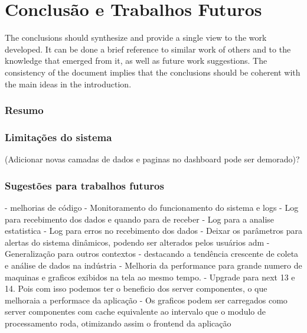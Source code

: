 \chapter{Conclusão e Trabalhos Futuros}\label{cap:conclusions}

The conclusions should synthesize and provide a single view to the work developed. It can be done a brief reference to similar work of others and to the knowledge that emerged from it, as well as future work suggestions. The consistency of the document implies that the conclusions should be coherent with the main ideas in the introduction.

\subsection[Resumo]{Resumo}

\subsection[Limitações do sistema]{Limitações do sistema}
(Adicionar novas camadas de dados e paginas no dashboard pode ser demorado)?

\subsection[Sugestões para trabalhos futuros]{Sugestões para trabalhos futuros}

- melhorias de código
- Monitoramento do funcionamento do sistema e logs
    - Log para recebimento dos dados e quando para de receber
    - Log para a analise estatistica
    - Log para erros no recebimento dos dados
- Deixar os parâmetros para alertas do sistema dinâmicos, podendo ser alterados pelos usuários adm
- Generalização para outros contextos - destacando a tendência crescente de coleta e análise de dados na indústria
- Melhoria da performance para grande numero de maquinas e graficos exibidos na tela ao mesmo tempo.
- Upgrade para next 13 e 14. Pois com isso podemos ter o beneficio dos server componentes, o que melhoraia a performace da aplicação - Os graficos podem ser carregados como server componentes com cache equivalente ao intervalo que o modulo de processamento roda, otimizando assim o frontend da aplicação





